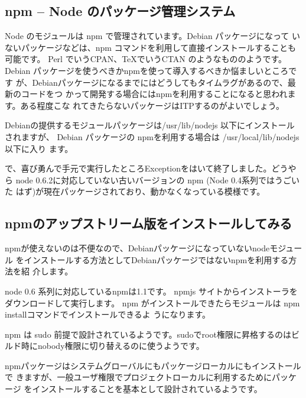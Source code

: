 \documentclass[mingoth,a4paper]{jsarticle}
\begin{document}
\subsection{npm -- Node のパッケージ管理システム}

Node のモジュールは npm で管理されています。Debian パッケージになって
いないパッケージなどは、npm コマンドを利用して直接インストールすることも可能です。
Perl でいうCPAN、TeXでいうCTAN のようなもののようです。
Debian パッケージを使うべきかnpmを使って導入するべきか悩ましいところです
が、Debianパッケージになるまでにはどうしてもタイムラグがあるので、最新のコードをつ
かって開発する場合にはnpmを利用することになると思われます。ある程度こな
れてきたらないパッケージはITPするのがよいでしょう。

Debianの提供するモジュールパッケージは/usr/lib/nodejs 以下にインストール
されますが、
Debian パッケージの npmを利用する場合は /usr/local/lib/nodejs 以下に入り
ます。

で、喜び勇んで手元で実行したところExceptionをはいて終了しました。どうやら
node 0.6.2に対応していない古いバージョンの npm (Node 0.4系列ではうごいた
はず)が現在パッケージされており、動かなくなっている模様です。

\subsection{npmのアップストリーム版をインストールしてみる}

npmが使えないのは不便なので、Debianパッケージになっていないnodeモジュール
をインストールする方法としてDebianパッケージではないnpmを利用する方法を紹
介します。

node 0.6 系列に対応しているnpmは1.1です。
npmjs\cite{npmjs} サイトからインストーラをダウンロードして実行します。
npm がインストールできたらモジュールは npm installコマンドでインストールできるよ
うになります。

npm は sudo 前提で設計されているようです。sudoでroot権限に昇格するのはビ
ルド時にnobody権限に切り替えるのに使うようです。

npmパッケージはシステムグローバルにもパッケージローカルにもインストールで
きますが、一般ユーザ権限でプロジェクトローカルに利用するためにパッケージ
をインストールすることを基本として設計されているようです。
\end{document}
